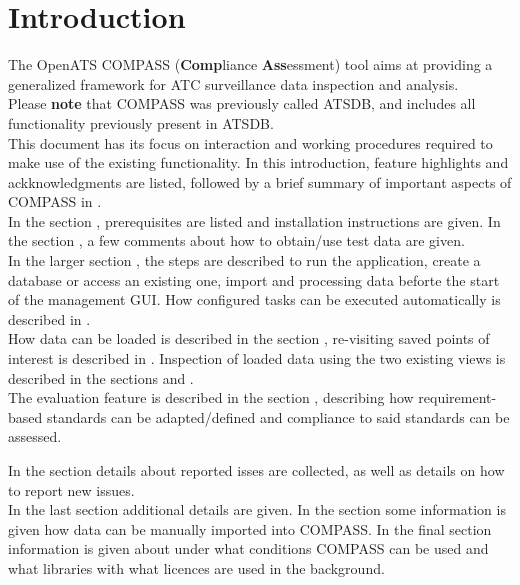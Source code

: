 \chapter{Introduction}

The OpenATS COMPASS (\textbf{Comp}liance \textbf{Ass}essment) tool aims at providing a generalized framework for ATC surveillance data inspection and analysis. \\

Please \textbf{note} that COMPASS was previously called ATSDB, and includes all functionality previously present in ATSDB. \\

This document has its focus on interaction and working procedures required to make use of the existing
functionality. In this introduction, feature highlights and ackknowledgments are listed, followed by a brief summary of important aspects of  COMPASS in . \\

In the section , prerequisites are listed and installation instructions are given. In the section , a few comments about how to obtain/use test data are given. \\

In the larger section , the steps are described to run the application, create a database or access an existing one, import and processing data beforte the start of the management GUI. How configured tasks can be executed automatically is described in . \\

How data can be loaded is described in the section , re-visiting saved points of interest is described in . Inspection of loaded data using the two existing views is described in the sections  and . \\

The evaluation feature is described in the section , describing how requirement-based standards can be adapted/defined and compliance to said standards can be assessed.

In the section  details about reported isses are collected, as well as details on how to report new issues. \\

In the last section  additional details are given. In the section  some information is given how data can be manually imported into COMPASS. In the final section  information is given about under what conditions COMPASS can be used and what 
libraries with what licences are used in the background.

\pagebreak













